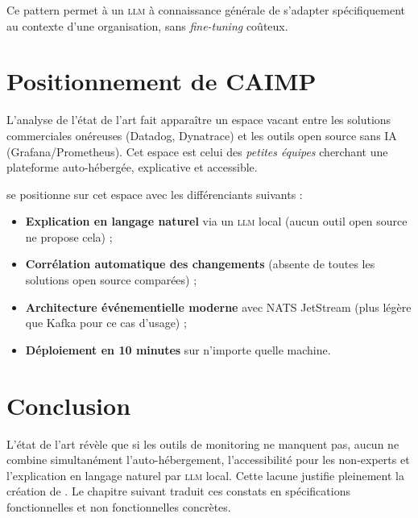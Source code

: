 Ce pattern permet à un \textsc{llm} à connaissance générale de s'adapter
spécifiquement au contexte d'une organisation, sans \textit{fine-tuning}
coûteux.

\section{Positionnement de CAIMP}

L'analyse de l'état de l'art fait apparaître un espace vacant entre les solutions
commerciales onéreuses (Datadog, Dynatrace) et les outils open source sans IA
(Grafana/Prometheus). Cet espace est celui des \textit{petites équipes} cherchant
une plateforme auto-hébergée, explicative et accessible.

\caimp{} se positionne sur cet espace avec les différenciants suivants :

\begin{itemize}
  \item \textbf{Explication en langage naturel} via un \textsc{llm} local (aucun
    outil open source ne propose cela) ;
  \item \textbf{Corrélation automatique des changements} (absente de toutes les
    solutions open source comparées) ;
  \item \textbf{Architecture événementielle moderne} avec NATS JetStream
    (plus légère que Kafka pour ce cas d'usage) ;
  \item \textbf{Déploiement en 10 minutes} sur n'importe quelle machine.
\end{itemize}

\section*{Conclusion}

L'état de l'art révèle que si les outils de monitoring ne manquent pas, aucun ne
combine simultanément l'auto-hébergement, l'accessibilité pour les non-experts
et l'explication en langage naturel par \textsc{llm} local. Cette lacune justifie
pleinement la création de \caimp{}. Le chapitre suivant traduit ces constats en
spécifications fonctionnelles et non fonctionnelles concrètes.
